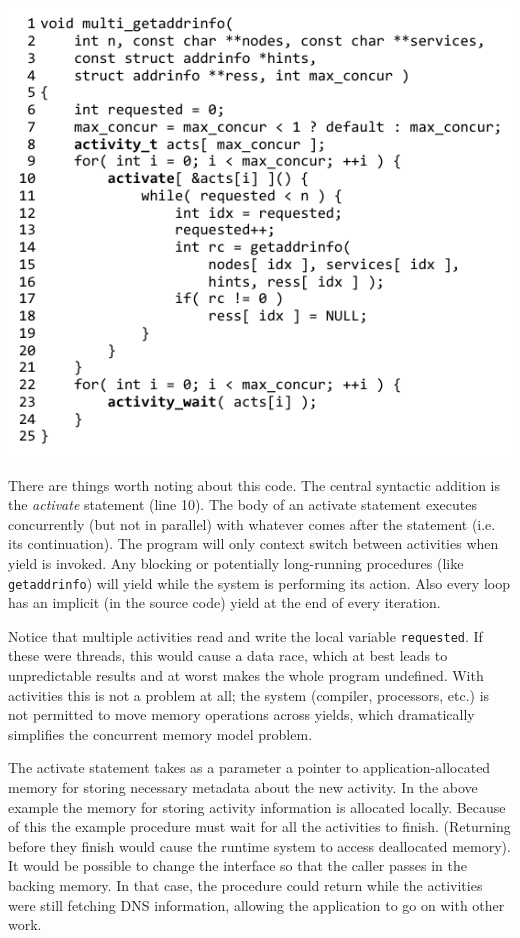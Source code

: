 \documentclass[10pt,preprint]{sigplanconf}
\begin{document}
\hspace{-0.5cm}
\includegraphics{multi_getaddrinfo}

There are things worth noting about this code.
The central syntactic addition is the \emph{activate} statement (line 10).
The body of an activate statement executes concurrently (but not in parallel) with whatever comes after the statement (i.e. its continuation).
The program will only context switch between activities when yield is invoked.
Any blocking or potentially long-running procedures (like \texttt{getaddrinfo}) will yield while the system is performing its action.
Also every loop has an implicit (in the source code) yield at the end of every iteration.

Notice that multiple activities read and write the local variable \texttt{requested}.
If these were threads, this would cause a data race, which at best leads to unpredictable results and at worst makes the whole program undefined.
With activities this is not a problem at all; the system (compiler, processors, etc.) is not permitted to move memory operations across yields, which dramatically simplifies the concurrent memory model problem.

The activate statement takes as a parameter a pointer to application-allocated memory for storing necessary metadata about the new activity.
In the above example the memory for storing activity information is allocated locally.
Because of this the example procedure must wait for all the activities to finish.
(Returning before they finish would cause the runtime system to access deallocated memory).
It would be possible to change the interface so that the caller passes in the backing memory.
In that case, the procedure could return while the activities were still fetching DNS information, allowing the application to go on with other work.
\end{document}
